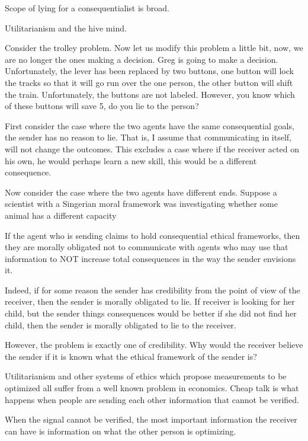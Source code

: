 \documentclass[11pt]{article}
\numberwithin{equation}{section}
\begin{document}
Scope of lying for a consequentialist is broad.

Utilitarianism and the hive mind. 

Consider the trolley problem. Now let us modify this problem a little bit, now, we are no longer the ones making a decision. Greg is going to make a decision. Unfortunately, the lever has been replaced by two buttons, one button will lock the tracks so that it will go run over the one person, the other button will shift the train. Unfortunately, the buttons are not labeled. However, you know which of these buttons will save 5, do you lie to the person?










First consider the case where the two agents have the same consequential goals, the sender has no reason to lie. That is, I assume that communicating in itself, will not change the outcomes. This excludes a case where if the receiver acted on his own, he would perhaps learn a new skill, this would be a different consequence. 

Now consider the case where the two agents have different ends. Suppose a scientist with a Singerian moral framework was investigating whether some animal has a different capacity 
  
If the agent who is sending claims to hold consequential ethical frameworks, then they are morally obligated not to communicate with agents who may use that information to NOT increase total consequences in the way the sender envisions it. 

Indeed, if for some reason the sender has credibility from the point of view of the receiver, then the sender is morally obligated to lie. If receiver is looking for her child, but the sender things consequences would be better if she did not find her child, then the sender is morally obligated to lie to the receiver. 

However, the problem is exactly one of credibility. Why would the receiver believe the sender if it is known what the ethical framework of the sender is? 

Utilitarianism and other systems of ethics which propose measurements to be optimized all suffer from a well known problem in economics. Cheap talk is what happens when people are sending each other information that cannot be verified. 

When the signal cannot be verified, the most important information the receiver can have is information on what the other person is optimizing. 
\end{document}
